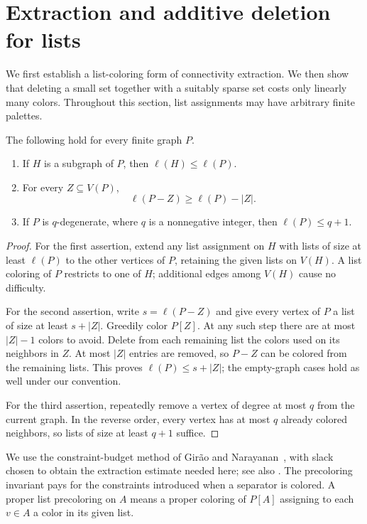 \section{Extraction and additive deletion for lists}
\label{sec:list-transfer}

We first establish a list-coloring form of connectivity extraction. We then
show that deleting a small set together with a suitably sparse set costs only
linearly many colors. Throughout this section, list assignments may have
arbitrary finite palettes.

\begin{lemma}\label{list:elementary}
The following hold for every finite graph $P$.
\begin{enumerate}[label=\textup{(\roman*)}]
\item If $H$ is a subgraph of $P$, then $\ell(H)\le \ell(P)$.
\item For every $Z\subseteq V(P)$,
\[
\ell(P-Z)\ge \ell(P)-|Z|.
\]
\item If $P$ is $q$-degenerate, where $q$ is a nonnegative integer, then
$\ell(P)\le q+1$.
\end{enumerate}
\end{lemma}

\begin{proof}
For the first assertion, extend any list assignment on $H$ with lists of
size at least $\ell(P)$ to the other vertices of $P$, retaining the given
lists on $V(H)$. A list coloring of $P$ restricts to one of $H$; additional
edges among $V(H)$ cause no difficulty.

For the second assertion, write $s=\ell(P-Z)$ and give every vertex of $P$
a list of size at least $s+|Z|$. Greedily color $P[Z]$. At any such step
there are at most $|Z|-1$ colors to avoid. Delete from each remaining list
the colors used on its neighbors in $Z$. At most $|Z|$ entries are removed,
so $P-Z$ can be colored from the remaining lists. This proves
$\ell(P)\le s+|Z|$; the empty-graph cases hold as well under our convention.

For the third assertion, repeatedly remove a vertex of degree at most $q$
from the current graph. In the reverse order, every vertex has at most $q$
already colored neighbors, so lists of size at least $q+1$ suffice.
\end{proof}

We use the constraint-budget method of Gir\~ao and
Narayanan~\cite{GiraoNarayanan2022}, with slack chosen to obtain the
extraction estimate needed here; see also \cite[Section~3.4]{Postle2020}.
The precoloring invariant pays for the
constraints introduced when a separator is colored. A proper list
precoloring on $A$ means a proper coloring of $P[A]$ assigning to each
$v\in A$ a color in its given list.

